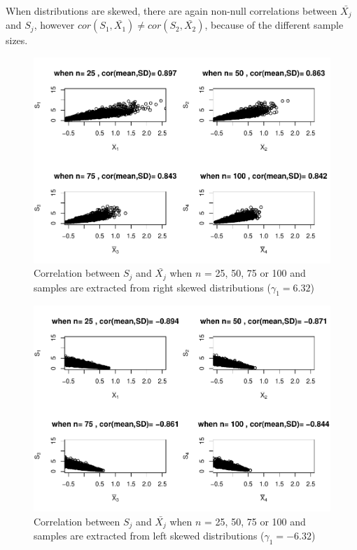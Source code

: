 \documentclass[
  english,
  man,mask]{apa6}
\begin{document}
When distributions are skewed, there are again non-null correlations between \(\bar{X_j}\) and \(S_j\), however \(cor(S_1,\bar{X_1}) \neq cor(S_2,\bar{X_2})\), because of the different sample sizes.

\begin{figure}
\centering
\includegraphics{Correlation_files/figure-latex/Homunbalcorasafctofn1-1.pdf}
\caption{\label{fig:Homunbalcorasafctofn1}Correlation between \(S_j\) and \(\bar{X_j}\) when \(n\) = 25, 50, 75 or 100 and samples are extracted from right skewed distributions (\(\gamma_1 = 6.32\))}
\end{figure}

\begin{figure}
\centering
\includegraphics{Correlation_files/figure-latex/Homunbalcorasafctofn2-1.pdf}
\caption{\label{fig:Homunbalcorasafctofn2}Correlation between \(S_j\) and \(\bar{X_j}\) when \(n\) = 25, 50, 75 or 100 and samples are extracted from left skewed distributions (\(\gamma_1 = -6.32\))}
\end{figure}
\end{document}
